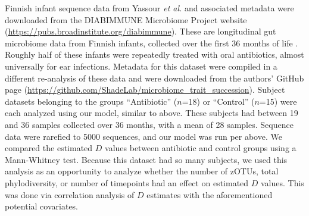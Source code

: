 \documentclass{article}
\begin{document}
\par
Finnish infant sequence data from Yassour \emph{et al.} \cite{Yassour2016} and associated metadata were downloaded from the DIABIMMUNE Microbiome Project website (\url{https://pubs.broadinstitute.org/diabimmune}). These are longitudinal gut microbiome data from Finnish infants, collected over the first 36 months of life \cite{Yassour2016}. Roughly half of these infants were repeatedly treated with oral antibiotics, almost universally for ear infections. Metadata for this dataset were compiled in a different re-analysis of these data \cite{Guittar2019} and were downloaded from the authors’ GitHub page (\url{https://github.com/ShadeLab/microbiome_trait_succession}). Subject datasets belonging to the groups “Antibiotic” (\(n\)=18) or “Control” (\(n\)=15) were each analyzed using our model, similar to above. These subjects had between 19 and 36 samples collected over 36 months, with a mean of 28 samples. Sequence data were rarefied to 5000 sequences, and our model was run per above. We compared the estimated \(D\) values between antibiotic and control groups using a Mann-Whitney test. Because this dataset had so many subjects, we used this analysis as an opportunity to analyze whether the number of zOTUs, total phylodiversity, or number of timepoints had an effect on estimated \(D\) values. This was done via correlation analysis of \(D\) estimates with the aforementioned potential covariates.



\end{document}
